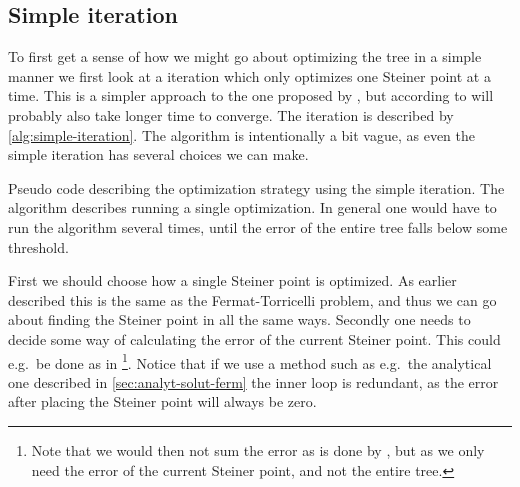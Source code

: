 \subsection{Simple iteration}
\label{sec:simple-iteration}

To first get a sense of how we might go about optimizing the tree in a simple
manner we first look at a iteration which only optimizes one Steiner point at a
time. This is a simpler approach to the one proposed by \textcite{smith1992},
but according to \citeauthor{smith1992} will probably also take longer time to
converge. The iteration is described by \cref{alg:simple-iteration}. The
algorithm is intentionally a bit vague, as even the simple iteration has several
choices we can make.

\begin{algorithm}[htbp]
  \caption[Simple iteration]{Pseudo code describing the optimization strategy
    using the simple iteration. The algorithm describes running a single
    optimization. In general one would have to run the algorithm several times,
    until the error of the entire tree falls below some threshold.\label{alg:simple-iteration}}
\end{algorithm}

First we should choose how a single Steiner point is optimized. As earlier
described this is the same as the Fermat-Torricelli problem, and thus we can go
about finding the Steiner point in all the same ways. Secondly one needs to
decide some way of calculating the error of the current Steiner point. This
could e.g.\ be done as in \textcite{smith1992}\footnote{Note that we would then
  not sum the error as is done by \citeauthor{smith1992}, but as we only need
  the error of the current Steiner point, and not the entire tree.}.  Notice
that if we use a method such as e.g.\ the analytical one described in
\cref{sec:analyt-solut-ferm} the inner loop is redundant, as the error after
placing the Steiner point will always be zero.

